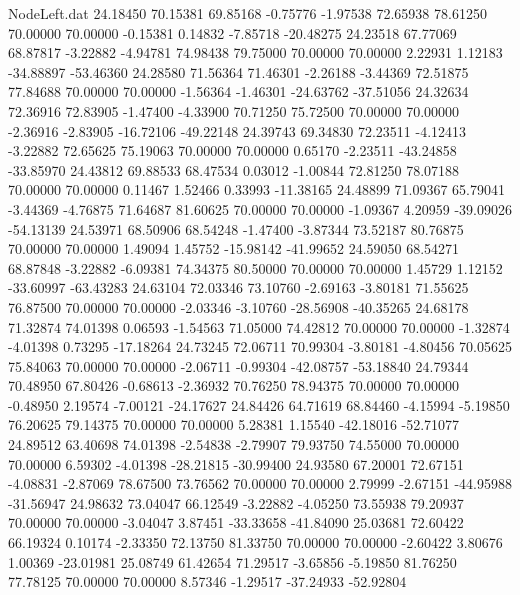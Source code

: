 \begin{filecontents}{NodeLeft.dat}
  24.18450   70.15381   69.85168    -0.75776   -1.97538   72.65938   78.61250   70.00000   70.00000   -0.15381    0.14832   -7.85718  -20.48275
  24.23518   67.77069   68.87817    -3.22882   -4.94781   74.98438   79.75000   70.00000   70.00000    2.22931    1.12183  -34.88897  -53.46360
  24.28580   71.56364   71.46301    -2.26188   -3.44369   72.51875   77.84688   70.00000   70.00000   -1.56364   -1.46301  -24.63762  -37.51056
  24.32634   72.36916   72.83905    -1.47400   -4.33900   70.71250   75.72500   70.00000   70.00000   -2.36916   -2.83905  -16.72106  -49.22148
  24.39743   69.34830   72.23511    -4.12413   -3.22882   72.65625   75.19063   70.00000   70.00000    0.65170   -2.23511  -43.24858  -33.85970
  24.43812   69.88533   68.47534     0.03012   -1.00844   72.81250   78.07188   70.00000   70.00000    0.11467    1.52466    0.33993  -11.38165
  24.48899   71.09367   65.79041    -3.44369   -4.76875   71.64687   81.60625   70.00000   70.00000   -1.09367    4.20959  -39.09026  -54.13139
  24.53971   68.50906   68.54248    -1.47400   -3.87344   73.52187   80.76875   70.00000   70.00000    1.49094    1.45752  -15.98142  -41.99652
  24.59050   68.54271   68.87848    -3.22882   -6.09381   74.34375   80.50000   70.00000   70.00000    1.45729    1.12152  -33.60997  -63.43283
  24.63104   72.03346   73.10760    -2.69163   -3.80181   71.55625   76.87500   70.00000   70.00000   -2.03346   -3.10760  -28.56908  -40.35265
  24.68178   71.32874   74.01398     0.06593   -1.54563   71.05000   74.42812   70.00000   70.00000   -1.32874   -4.01398    0.73295  -17.18264
  24.73245   72.06711   70.99304    -3.80181   -4.80456   70.05625   75.84063   70.00000   70.00000   -2.06711   -0.99304  -42.08757  -53.18840
  24.79344   70.48950   67.80426    -0.68613   -2.36932   70.76250   78.94375   70.00000   70.00000   -0.48950    2.19574   -7.00121  -24.17627
  24.84426   64.71619   68.84460    -4.15994   -5.19850   76.20625   79.14375   70.00000   70.00000    5.28381    1.15540  -42.18016  -52.71077
  24.89512   63.40698   74.01398    -2.54838   -2.79907   79.93750   74.55000   70.00000   70.00000    6.59302   -4.01398  -28.21815  -30.99400
  24.93580   67.20001   72.67151    -4.08831   -2.87069   78.67500   73.76562   70.00000   70.00000    2.79999   -2.67151  -44.95988  -31.56947
  24.98632   73.04047   66.12549    -3.22882   -4.05250   73.55938   79.20937   70.00000   70.00000   -3.04047    3.87451  -33.33658  -41.84090
  25.03681   72.60422   66.19324     0.10174   -2.33350   72.13750   81.33750   70.00000   70.00000   -2.60422    3.80676    1.00369  -23.01981
  25.08749   61.42654   71.29517    -3.65856   -5.19850   81.76250   77.78125   70.00000   70.00000    8.57346   -1.29517  -37.24933  -52.92804

\end{filecontents}
